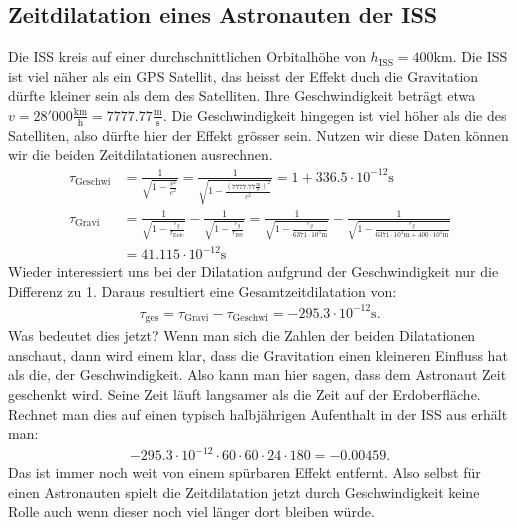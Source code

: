 \begin{refsection}
\subsection{Zeitdilatation eines Astronauten der ISS}
Die ISS kreis auf einer durchschnittlichen Orbitalhöhe von \( h_{\text{ISS}} = 400\text{km} \). Die ISS ist viel näher als ein GPS Satellit, das heisst der Effekt duch die Gravitation dürfte kleiner sein als dem des Satelliten. Ihre Geschwindigkeit beträgt etwa \( v = 28'000\frac{\text{km}}{\text{h}} = 7777.77\frac{\text{m}}{\text{s}} \). Die Geschwindigkeit hingegen ist viel höher als die des Satelliten, also dürfte hier der Effekt grösser sein. Nutzen wir diese Daten können wir die beiden Zeitdilatationen ausrechnen.
\begin{align*}
\tau_{\text{Geschwi}}
&=
\frac{1}{\sqrt{\displaystyle 1 - \frac{v^2}{c^2}}} = \frac{1}{\sqrt{\displaystyle 1 - \frac{( 7777.77\frac{\text{m}}{\text{s}})^2}{c^2}}} = 1 + 336.5 \cdot 10^{-12}\text{s}
\\
\tau_{\text{Gravi}}
&=
\frac{1}{\sqrt{\displaystyle 1-\frac{r_g}{r_{\text{Erde}}}}} - \frac{1}{\sqrt{\displaystyle 1-\frac{r_g}{r_{\text{ISS}}}}} 
= \frac{1}{\sqrt{\displaystyle 1-\frac{r_g}{6371 \cdot 10^3\text{m}}}} - \frac{1}{\sqrt{\displaystyle 1-\frac{r_g}{6371 \cdot 10^3\text{m} + 400 \cdot 10^3\text{m}}}}
\\
&= 41.115 \cdot 10^{-12}\text{s}
\end{align*}
Wieder interessiert uns bei der Dilatation aufgrund der Geschwindigkeit nur die Differenz zu 1. Daraus resultiert eine Gesamtzeitdilatation von:
\begin{align*}
\tau_{\text{ges}} = \tau_{\text{Gravi}} - \tau_{\text{Geschwi}} = -295.3 \cdot 10^{-12}\text{s}.
\end{align*}
Was bedeutet dies jetzt? Wenn man sich die Zahlen der beiden Dilatationen anschaut, dann wird einem klar, dass die Gravitation einen kleineren Einfluss hat als die, der Geschwindigkeit. Also kann man hier sagen, dass dem Astronaut Zeit geschenkt wird. Seine Zeit läuft langsamer als die Zeit auf der Erdoberfläche. Rechnet man dies auf einen typisch halbjährigen Aufenthalt in der ISS aus erhält man:
\begin{align*}
-295.3 \cdot 10^{-12} \cdot 60 \cdot 60 \cdot 24 \cdot 180 = -0.00459.
\end{align*}
Das ist immer noch weit von einem spürbaren Effekt entfernt. Also selbst für einen Astronauten spielt die Zeitdilatation jetzt durch Geschwindigkeit keine Rolle auch wenn dieser noch viel länger dort bleiben würde.


\end{refsection}
